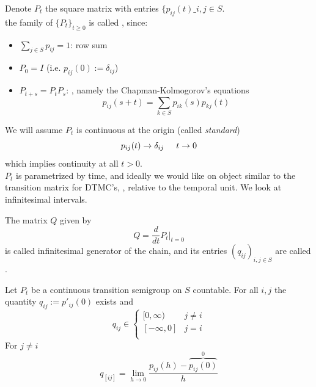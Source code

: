 \documentclass{article}
\begin{document}
	Denote $P_t$ the square matrix with entries $\{p_{ij}(t)\_{i, j \in S}$. \\
	the family of $\{P_t\}_{t\geqslant 0}$ is called , since:
	\begin{itemize}
		\item $\sum_{j \in S} p_{ij} = 1$: row sum
		\item $P_0=I$ (i.e. $p_{ij}(0):=\delta_{ij}$)
		\item $P_{t+s}= P_t P_s$:  , namely the Chapman-Kolmogorov's equations 
		\begin{equation*}
			p_{ij}(s+t)= \sum_{k \in S} p_{ik}(s) p_{kj}(t)
		\end{equation*}
	\end{itemize}
	We will assume $P_t$ is continuous at the origin (called \textit{standard})
	\begin{equation*}
		p_{ij}(t) \rightarrow \delta_{ij} \hspace{0.5 cm} t \rightarrow 0
	\end{equation*}
	which implies continuity at all $t>0$.\\
	$P_t$ is parametrized by time, and ideally we would like on object similar to the transition matrix for DTMC's, , relative to the temporal unit. We look at infinitesimal intervals. 
	\begin{definition}
		The matrix $Q$ given by 
		\begin{equation*}
			Q= \frac{d}{dt}P_t |_{t=0}
		\end{equation*}
		is called infinitesimal generator of the chain, and its entries $(q_{ij})_{i,j \in S}$ are called .
	\end{definition}
	\begin{proposition}
		Let $P_t$ be a continuous transition semigroup on $S$ countable. For all $i,j$ the quantity $q_{ij}:=p'_{ij}(0)$ exists and 
		\[q_{ij} \in
		\begin{cases}
			[0,\infty) & j \neq i \\
			[-\infty, 0] & j = i \\
		\end{cases}
		\]
		For $j \neq i$
		\begin{equation*}
			q_[ij] = \lim_{h \rightarrow 0} \frac{p_{ij}(h) - \overbrace{p_{ij}(0)}^{0}}{h}
		\end{equation*}
	\end{proposition}
\end{document}
